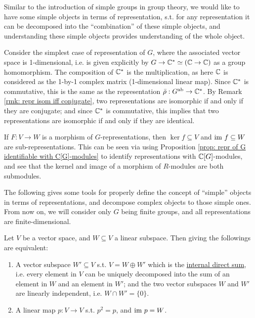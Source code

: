 \documentclass{article}
\begin{document}
\textstart
Similar to the introduction of simple groups in group theory, we would like to have some simple objects in terms of representation, s.t. for any representation it can be decomposed into the ``combination'' of these simple objects, and understanding these simple objects provides understanding of the whole object. 

Consider the simplest case of representation of $G$, where the associated vector space is 1-dimensional, i.e. is given explicitly by $G \to \mathbb{C}^{\ast} \simeq (\mathbb{C} \to \mathbb{C})$ as a group homomorphism. The composition of $\mathbb{C}^{\ast}$ is the multiplication, as here $\mathbb{C}$ is considered as the 1-by-1 complex matrix (1-dimensional linear map). Since $\mathbb{C}^{\ast}$ is commutative, this is the same as the representation $\bar{\rho}: G^{\mathrm{ab}} \to \mathbb{C}^{\ast}$. By Remark \ref{rmk: repr isom iff conjugate}, two representations are isomorphic if and only if they are conjugate; and since $\mathbb{C}^{\ast}$ is commutative, this implies that two representations are isomorphic if and only if they are identical.

\begin{corollary}\label{cor: kernel and image of morphism of repr. is repr.}
    If $F: V \to W$ is a morphism of $G$-representations, then $\ker f \subseteq V$ and $\mathrm{im}\  f \subseteq W$ are sub-representations. This can be seen via using Proposition \ref{prop: repr of G identifiable with C[G]-modules} to identify representations with $\mathbb{C}[G]$-modules, and see that the kernel and image of a morphism of $R$-modules are both submodules. 
\end{corollary}

The following gives some tools for properly define the concept of ``simple'' objects in terms of representations, and decompose complex objects to those simple ones. From now on, we will consider only $G$ being finite groups, and all representations are finite-dimensional.

\begin{parenthesis}\label{pth: equiv in v.s. for internal sum and projection}
    Let $V$ be a vector space, and $W \subseteq V$ a linear subspace. Then giving the followings are equivalent:
    \begin{enumerate}[label=\arabic*)]
        \item A vector subspace $W' \subseteq V$ s.t. $V = W \oplus W'$ which is the \underline{internal direct sum}, i.e. every element in $V$ can be uniquely decomposed into the sum of an element in $W$ and an element in $W'$; and the two vector subspaces $W$ and $W'$ are linearly independent, i.e. $W \cap W' = \{0\}$.
        \item A linear map $p: V \to V$ s.t. $p^2 = p$, and $\mathrm{im}\  p = W$.
    \end{enumerate}
\end{parenthesis}
\end{document}
